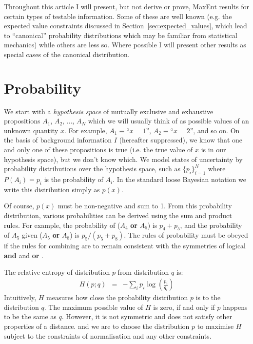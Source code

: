 \documentclass[a4paper, 11pt]{article}
\begin{document}
Throughout this article I will present, but not derive or prove, MaxEnt
results for certain types of testable information. Some of these are well
known (e.g. the expected value constraints discussed in
Section~\ref{sec:expected_values}, which lead to ``canonical'' probability
distributions which may be familiar from statistical mechanics) while others
are less so. Where possible I will present other results as special cases of
the canonical distribution.

\section{Probability}
We start with a {\it hypothesis space} of mutually exclusive and
exhaustive propositions $A_1$, $A_2$, ..., $A_N$ which we will usually
think of as possible values of an unknown quantity $x$. For example,
$A_1 \equiv $``$x=1$'', $A_2 \equiv $``$x=2$'', and so on.
On the basis of background
information $I$ (hereafter suppressed), we know that one and only one of these
propositions is true (i.e. the true value of $x$ is in our hypothesis space),
but we don't know which. We model states of
uncertainty by probability distributions over the hypothesis space,
such as $\{p_i\}_{i=1}^N$ where $P(A_i) = p_i$ is the probability of $A_i$.
In the standard loose Bayesian notation we write this distribution simply
as $p(x)$.

Of course, $p(x)$ must be non-negative and sum to 1.
From this probability distribution, various probabilities can be derived
using the sum and product rules. For example, the probability of
($A_4$ {\bf or} $A_5$) is $p_4 + p_5$, and the probability of $A_5$ given
($A_5$ {\bf or} $A_8$) is $p_5/(p_5 + p_8)$. The rules of probability must
be obeyed if the rules for combining are to remain consistent
with the symmetries of logical {\bf and} and {\bf or}
\citep{2010arXiv1008.4831K}.

The relative entropy of distribution $p$ from distribution $q$ is:
\begin{eqnarray}
H(p; q) &=& -\sum_i p_i \log\left(\frac{p_i}{q_i}\right) 
\end{eqnarray}
Intuitively, $H$ measures how close the probability distribution $p$ is
to the distribution $q$. The maximum possible value of $H$ is zero, if
and only if $p$ happens to be the same as $q$.
However, it is not symmetric and does not satisfy
other properties of a distance.
and we are to choose the distribution $p$ to maximise $H$ subject to the
constraints of normalisation and any other constraints.
\end{document}
